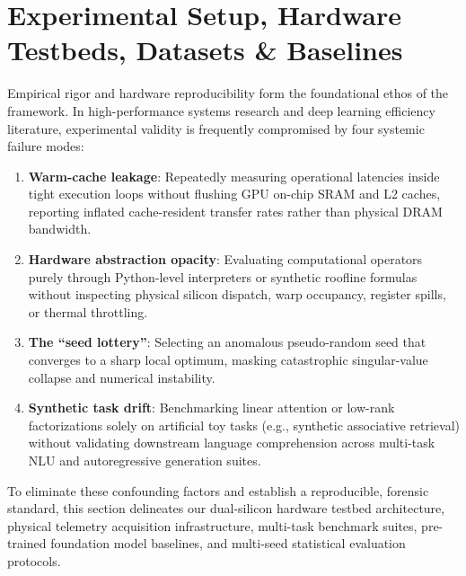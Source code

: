 
\section{Experimental Setup, Hardware Testbeds, Datasets \& Baselines}
\label{sec:experimental_setup}

Empirical rigor and hardware reproducibility form the foundational ethos of the \neuralops{} framework. In high-performance systems research and deep learning efficiency literature, experimental validity is frequently compromised by four systemic failure modes:
\begin{enumerate}
    \item \textbf{Warm-cache leakage}: Repeatedly measuring operational latencies inside tight execution loops without flushing GPU on-chip SRAM and L2 caches, reporting inflated cache-resident transfer rates rather than physical DRAM bandwidth.
    \item \textbf{Hardware abstraction opacity}: Evaluating computational operators purely through Python-level interpreters or synthetic roofline formulas without inspecting physical silicon dispatch, warp occupancy, register spills, or thermal throttling.
    \item \textbf{The ``seed lottery''}: Selecting an anomalous pseudo-random seed that converges to a sharp local optimum, masking catastrophic singular-value collapse and numerical instability.
    \item \textbf{Synthetic task drift}: Benchmarking linear attention or low-rank factorizations solely on artificial toy tasks (e.g., synthetic associative retrieval) without validating downstream language comprehension across multi-task NLU and autoregressive generation suites.
\end{enumerate}

To eliminate these confounding factors and establish a reproducible, forensic standard, this section delineates our dual-silicon hardware testbed architecture, physical telemetry acquisition infrastructure, multi-task benchmark suites, pre-trained foundation model baselines, and multi-seed statistical evaluation protocols.

